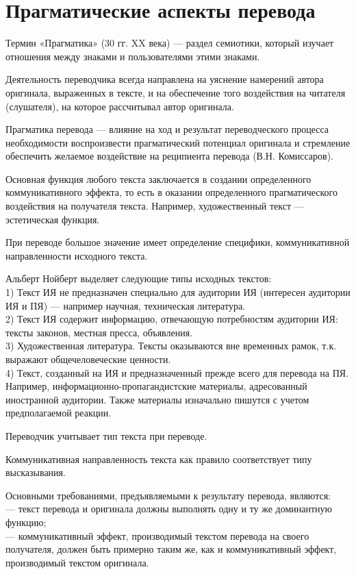 \section{Прагматические аспекты перевода}

Термин «Прагматика» (30 гг. XX века) --- раздел семиотики, который изучает отношения между знаками и пользователями этими знаками.

Деятельность переводчика всегда направлена на уяснение намерений автора оригинала, выраженных в тексте, и на обеспечение того воздействия на читателя (слушателя), на которое рассчитывал автор оригинала. 

Прагматика перевода --- влияние на ход и результат переводческого процесса необходимости воспроизвести прагматический потенциал оригинала и стремление обеспечить желаемое воздействие на реципиента перевода (В.Н. Комиссаров).

Основная функция любого текста заключается в создании определенного коммуникативного эффекта, то есть в оказании определенного прагматического воздействия на получателя текста. Например, художественный текст --- эстетическая функция.

При переводе большое значение имеет определение специфики, коммуникативной направленности исходного текста.

Альберт Нойберт выделяет следующие типы исходных текстов:
\\
1) Текст ИЯ не предназначен специально для аудитории ИЯ (интересен аудитории ИЯ и ПЯ) --- например научная, техническая литература.
\\
2) Текст ИЯ содержит информацию, отвечающую потребностям аудитории ИЯ: тексты законов, местная пресса, объявления.
\\
3) Художественная литература. Тексты оказываются вне временных рамок, т.к. выражают общечеловеческие ценности.
\\
4) Текст, созданный на ИЯ и предназначенный прежде всего для перевода на ПЯ. Например, информационно-пропагандистские материалы, адресованный иностранной аудитории. Также материалы изначально пишутся с учетом предполагаемой реакции.

Переводчик учитывает тип текста при переводе.

Коммуникативная направленность текста как правило соответствует типу высказывания. 

Основными требованиями, предъявляемыми к результату перевода, являются:
\\
--- текст перевода и оригинала должны выполнять одну и ту же доминантную функцию;
\\
--- коммуникативный эффект, производимый текстом перевода на своего получателя, должен быть примерно таким же, как и коммуникативный эффект, производимый текстом оригинала.

